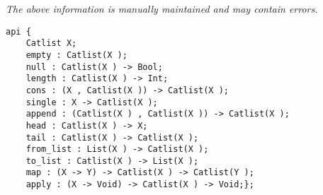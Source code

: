 \label{api:Catlist}

{\tiny \it The above information is manually maintained and may contain errors.}
\begin{verbatim}
api {
    Catlist X;
    empty : Catlist(X );
    null : Catlist(X ) -> Bool;
    length : Catlist(X ) -> Int;
    cons : (X , Catlist(X )) -> Catlist(X );
    single : X -> Catlist(X );
    append : (Catlist(X ) , Catlist(X )) -> Catlist(X );
    head : Catlist(X ) -> X;
    tail : Catlist(X ) -> Catlist(X );
    from_list : List(X ) -> Catlist(X );
    to_list : Catlist(X ) -> List(X );
    map : (X -> Y) -> Catlist(X ) -> Catlist(Y );
    apply : (X -> Void) -> Catlist(X ) -> Void;};
\end{verbatim}
